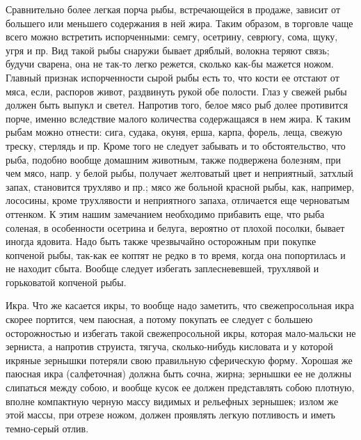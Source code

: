 Сравнительно более легкая порча рыбы, встречающейся в продаже, зависит от большего или меньшего содержания в ней жира. Таким образом, в торговле чаще всего можно встретить испорченными: семгу, осетрину, севрюгу, сома, щуку, угря и пр. Вид такой рыбы снаружи бывает дряблый, волокна теряют связь; будучи сварена, она не так-то легко режется, сколько как-бы мажется ножом. Главный признак испорченности сырой рыбы есть то, что кости ее отстают от мяса, если, распоров живот, раздвинуть рукой обе полости. Глаз у свежей рыбы должен быть выпукл и светел. Напротив того, белое мясо рыб долее противится порче, именно вследствие малого количества содержащаяся в нем жира. К таким рыбам можно отнести: сига, судака, окуня, ерша, карпа, форель, леща, свежую треску, стерлядь и пр. Кроме того не следует забывать и то обстоятельство, что рыба, подобно вообще домашним животным, также подвержена болезням, при чем мясо, напр. у белой рыбы, получает желтоватый цвет и неприятный, затхлый запах, становится трухляво и пр.; мясо же больной красной рыбы, как, например, лососины, кроме трухлявости и неприятного запаха, отличается еще черноватым оттенком. К этим нашим замечанием необходимо прибавить еще, что рыба соленая, в особенности осетрина и белуга, вероятно от плохой посолки, бывает иногда ядовита. Надо быть также чрезвычайно осторожным при покупке копченой рыбы, так-как ее коптят не редко в то время, когда она попортилась и не находит сбыта. Вообще следует избегать заплесневевшей, трухлявой и горьковатой копченой рыбы.

Икра. Что же касается икры, то вообще надо заметить, что свежепросольная икра скорее портится, чем паюсная, а потому покупать ее следует с большею осторожностью и избегать такой свежепросольной икры, которая мало-мальски не зерниста, а напротив струиста, тягуча, сколько-нибудь кисловата и у которой икряные зернышки потеряли свою правильную сферическую форму. Хорошая же паюсная икра (салфеточная) должна быть сочна, жирна; зернышки ее не должны слипаться между собою, и вообще кусок ее должен представлять собою плотную, вполне компактную черную массу видимых и рельефных зернышек; излом же этой массы, при отрезе ножом, должен проявлять легкую потливость и иметь темно-серый отлив.

